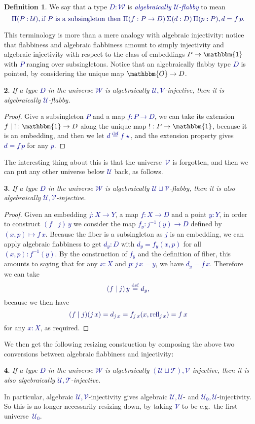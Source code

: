 \documentclass[10pt]{article}
\newcommand{\db}{\textcolor{darkblue}}
\newcommand{\df}[1]{\emph{\db{#1}}}
\newcommand{\m}[1]{\db{$#1$}}
\newcommand{\M}[1]{\[\db{#1}\]}
\newcommand{\U}{\mathcal{U}}
\newcommand{\V}{\mathcal{V}}
\newcommand{\W}{\mathcal{W}}
\newcommand{\T}{\mathcal{T}}
\newcommand{\Zero}{\mathbbm{O}}
\newcommand{\One}{\mathbbm{1}}
\newcommand{\one}{\operatorname{\star}}
\newcommand{\refl}{\operatorname{refl}}
\newcommand{\eqdef}{\overset{\text{def}}{=}}
\newtheorem{numbered}{}
\theoremstyle{definition}
\newtheorem{definition}[numbered]{Definition}
\begin{document}
\begin{definition}
  We say that a type \m{D : \W} is \df{algebraically \m{\U}-flabby} to mean
%
\M{
  \Pi (P : \U), \text{if \m{P} is a subsingleton then \m{\Pi(f : P \to D)\, \Sigma (d : D)\, \Pi(p : P), d = f \, p}.}
}
%
\end{definition}
\noindent This terminology is more than a mere analogy with
algebraic injectivity: notice that flabbiness and algebraic flabbiness
amount to simply injectivity and algebraic injectivity with respect to
the class of embeddings \m{P \to \One} with \m{P} ranging over
subsingletons. Notice that an algebraically flabby type \m{D} is pointed, by considering the unique map \m{\Zero \to D}.

\begin{numbered}
  If a type \m{D} in the universe \m{\W} is algebraically
  \m{\U,\V}-injective, then it is algebraically \m{\U}-flabby.
\end{numbered}
\begin{proof}
  Give a subsingleton \m{P} and a map \m{f : P \to D}, we can take its extension \m{f \mid \operatorname{!}: \One \to D} along the unique map \m{!:P \to \One}, because it is an embedding, and then we let \m{d \eqdef f \, \one}, and the extension property gives \m{d = f \, p} for any \m{p}.
\end{proof}
The interesting thing about this is that the
universe~\m{\V} is forgotten, and then we can put any other universe
below \m{\U} back, as follows.

\begin{numbered}
  If a type \m{D} in the universe \m{\W} is algebraically \m{\U \sqcup
    \V}-flabby, then it is also algebraically \m{\U,\V}-injective.
\end{numbered}
\begin{proof}
  Given an embedding \m{j : X \to Y}, a map \m{f : X \to D} and a
  point \m{y:Y}, in order to construct \m{(f \mid j) \, y} we consider
  the map \m{f_y : j^{-1}(y) \to D} defined by \m{(x,p) \mapsto
    f\,x}. Because the fiber is a subsingleton as \m{j} is an
  embedding, we can apply algebraic flabbiness to get \m{d_y : D} with
  \m{d_y = f_y (x,p)} for all \m{(x,p):f^{-1}(y)}. By the construction of
  \m{f_y} and the definition of fiber, this amounts to saying that for
  any \m{x : X} and \m{p : j \, x = y}, we have \m{d_y = f \,
    x}. Therefore we can take
%
\M{(f \mid j) \, y \eqdef d_y,}
because we then have
%
\M{(f \mid j) (j \, x) = d_{j \, x} = f_{j \, x} (x , \refl_{j \, x}) = f \, x}
%
for any \m{x:X}, as required.
\end{proof}
\noindent We then get the following resizing construction by composing the above
two conversions between algebraic flabbiness and injectivity:
\begin{numbered}
  If a type \m{D} in the universe \m{\W} is algebraically \m{(\U \sqcup
    \T),\V}-injective, then it is also algebraically \m{\U,\T}-injective.
\end{numbered}
\noindent In particular, algebraic \m{\U,\V}-injectivity gives
algebraic \m{\U,\U}- and \m{\U_0,\U}-injectivity.  So this is no
longer necessarily resizing down, by taking \m{\V} to be
e.g.\ the first universe~\m{\U_0}.
\end{document}
